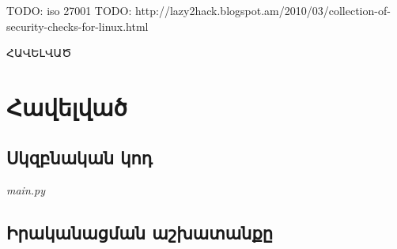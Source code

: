 \documentclass[10pt]{article}
\begin{document}
\begin{sloppypar}
TODO: iso 27001
TODO: http://lazy2hack.blogspot.am/2010/03/collection-of-security-checks-for-linux.html




\newpage
{}
\vspace*{\fill}
\begingroup
\centering
\centerline{\Huge{ՀԱՎԵԼՎԱԾ}}
\endgroup
\vspace*{\fill}
\newpage

\section*{Հավելված}
\subsection*{Սկզբնական կոդ}

\textit{main.py}
%

\newpage
\subsection*{Իրականացման աշխատանքը}

\end{sloppypar}
\end{document}
